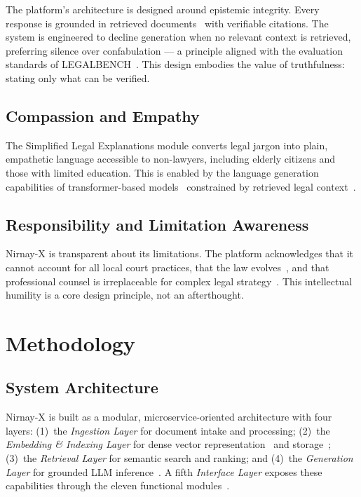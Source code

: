 \documentclass[12pt,a4paper]{article}
\begin{document}
The platform's architecture is designed around epistemic integrity. Every response is
grounded in retrieved documents~\cite{lewis2020rag} with verifiable citations. The
system is engineered to decline generation when no relevant context is retrieved,
preferring silence over confabulation --- a principle aligned with the evaluation
standards of LEGALBENCH~\cite{guha2023legalbench}. This design embodies the value
of truthfulness: stating only what can be verified.

\subsection{Compassion and Empathy}

The Simplified Legal Explanations module converts legal jargon into plain, empathetic
language accessible to non-lawyers, including elderly citizens and those with limited
education. This is enabled by the language generation capabilities of transformer-based
models~\cite{vaswani2017attention, devlin2019bert} constrained by retrieved legal
context~\cite{lewis2020rag}.

\subsection{Responsibility and Limitation Awareness}

Nirnay-X is transparent about its limitations. The platform acknowledges that it cannot
account for all local court practices, that the law evolves~\cite{mlaw}, and that
professional counsel is irreplaceable for complex legal strategy~\cite{ashley2017ai}.
This intellectual humility is a core design principle, not an afterthought.

\section{Methodology}

\subsection{System Architecture}

Nirnay-X is built as a modular, microservice-oriented architecture with four layers:
(1)~the \textit{Ingestion Layer} for document intake and processing; (2)~the
\textit{Embedding \& Indexing Layer} for dense vector representation~\cite{reimers2019sbert}
and storage~\cite{manning2008ir}; (3)~the \textit{Retrieval Layer} for semantic search
and ranking; and (4)~the \textit{Generation Layer} for grounded LLM
inference~\cite{lewis2020rag, vaswani2017attention}. A fifth \textit{Interface Layer}
exposes these capabilities through the eleven functional modules~\cite{ashley2017ai}.
\end{document}

